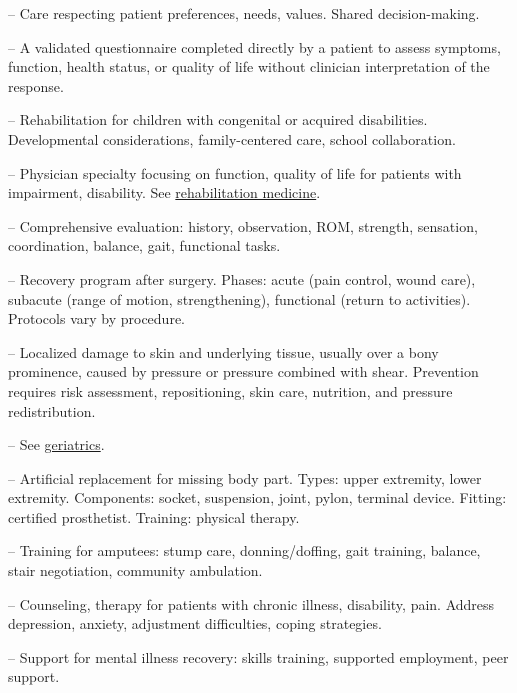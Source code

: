 -- Care respecting patient preferences, needs, values. Shared decision-making.

-- A validated questionnaire completed directly by a patient to assess symptoms, function, health status, or quality of life without clinician interpretation of the response.

-- Rehabilitation for children with congenital or acquired disabilities. Developmental considerations, family-centered care, school collaboration.

-- Physician specialty focusing on function, quality of life for patients with impairment, disability. See \hyperlink{Rehabilitation Medicine}{rehabilitation medicine}.

-- Comprehensive evaluation: history, observation, ROM, strength, sensation, coordination, balance, gait, functional tasks.

-- Recovery program after surgery. Phases: acute (pain control, wound care), subacute (range of motion, strengthening), functional (return to activities). Protocols vary by procedure.


-- Localized damage to skin and underlying tissue, usually over a bony prominence, caused by pressure or pressure combined with shear. Prevention requires risk assessment, repositioning, skin care, nutrition, and pressure redistribution.

-- See \hyperlink{Geriatrics}{geriatrics}.

-- Artificial replacement for missing body part. Types: upper extremity, lower extremity. Components: socket, suspension, joint, pylon, terminal device. Fitting: certified prosthetist. Training: physical therapy.

-- Training for amputees: stump care, donning/doffing, gait training, balance, stair negotiation, community ambulation.

-- Counseling, therapy for patients with chronic illness, disability, pain. Address depression, anxiety, adjustment difficulties, coping strategies.

-- Support for mental illness recovery: skills training, supported employment, peer support.

